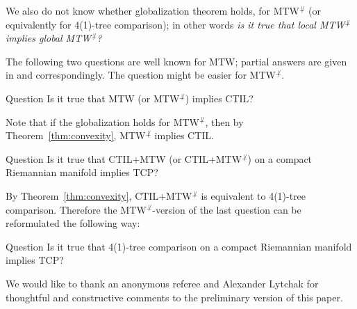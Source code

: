 We also do not know whether globalization theorem holds, for MTW$^{\not\perp}$ (or equivalently for 4(1)-tree comparison); in other words \emph{is it true that local MTW$^{\not\perp}$ implies global MTW$^{\not\perp}$?}

The following two questions are well known for MTW;
partial answers are given in \cite{MTW+CTIL+} and \cite{loeper} correspondingly.
The question might be easier for MTW$^{\not\perp}$.

\begin{thm}{Question}
Is it true that MTW (or MTW$^{\not\perp}$) implies CTIL?
\end{thm}

Note that if the globalization holds for MTW$^{\not\perp}$, then by Theorem~\ref{thm:convexity}, MTW$^{\not\perp}$ implies CTIL.

\begin{thm}{Question}
Is it true that CTIL+MTW (or CTIL+MTW$^{\not\perp}$) on a compact Riemannian manifold implies TCP?
\end{thm}

By Theorem~\ref{thm:convexity}, CTIL+MTW$^{\not\perp}$ is equivalent to 4(1)-tree comparison. 
Therefore the MTW$^{\not\perp}$-version of the last question can be reformulated the following way:

\begin{thm}{Question} Is it true that 4(1)-tree comparison on a compact Riemannian manifold implies TCP?
\end{thm}

We would like to thank an anonymous referee and Alexander Lytchak for thoughtful and constructive comments to the preliminary version of this paper. 
